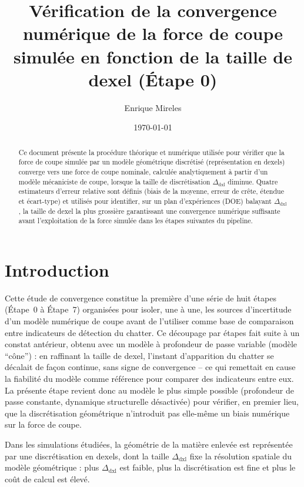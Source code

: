 \documentclass[
    11pt,
    a4paper
]{article}
\title{
    \textbf{Vérification de la convergence numérique de la force de coupe simulée en fonction de la taille de dexel (Étape 0)}
}
\author{
    Enrique Mireles
}
\date{\today}
\newcommand{\dxlsize}{\Delta_{\mathrm{dxl}}}
\begin{document}
\maketitle

\begin{abstract}

Ce document présente la procédure théorique et numérique utilisée pour vérifier que la
force de coupe simulée par un modèle géométrique discrétisé (représentation en dexels)
converge vers une force de coupe nominale, calculée analytiquement à partir d'un modèle
mécaniciste de coupe, lorsque la taille de discrétisation \(\dxlsize\) diminue. Quatre
estimateurs d'erreur relative sont définis (biais de la moyenne, erreur de crête, étendue
et écart-type) et utilisés pour identifier, sur un plan d'expériences (DOE) balayant
\(\dxlsize\), la taille de dexel la plus grossière garantissant une convergence numérique
suffisante avant l'exploitation de la force simulée dans les étapes suivantes du pipeline.

\end{abstract}

\tableofcontents

\newpage

\section{Introduction}
\label{sec-introduction}

Cette étude de convergence constitue la première d'une série de huit étapes (Étape~0 à
Étape~7) organisées pour isoler, une à une, les sources d'incertitude d'un modèle numérique
de coupe avant de l'utiliser comme base de comparaison entre indicateurs de détection du
chatter. Ce découpage par étapes fait suite à un constat antérieur, obtenu avec un modèle à
profondeur de passe variable (modèle \enquote{cône}) : en raffinant la taille de dexel,
l'instant d'apparition du chatter se décalait de façon continue, sans signe de convergence
-- ce qui remettait en cause la fiabilité du modèle comme référence pour comparer des
indicateurs entre eux. La présente étape revient donc au modèle le plus simple possible
(profondeur de passe constante, dynamique structurelle désactivée) pour vérifier, en
premier lieu, que la discrétisation géométrique n'introduit pas elle-même un biais
numérique sur la force de coupe.

Dans les simulations étudiées, la géométrie de la matière enlevée est représentée par une
discrétisation en dexels, dont la taille \(\dxlsize\) fixe la résolution spatiale du
modèle géométrique : plus \(\dxlsize\) est faible, plus la discrétisation est fine et plus
le coût de calcul est élevé.
\end{document}
